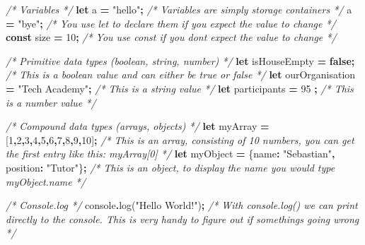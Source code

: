 \documentclass[
]{article}
\newenvironment{Shaded}{\begin{snugshade}}{\end{snugshade}}
\newcommand{\BuiltInTok}[1]{#1}
\newcommand{\CommentTok}[1]{\textcolor[rgb]{0.56,0.35,0.01}{\textit{#1}}}
\newcommand{\DataTypeTok}[1]{\textcolor[rgb]{0.13,0.29,0.53}{#1}}
\newcommand{\DecValTok}[1]{\textcolor[rgb]{0.00,0.00,0.81}{#1}}
\newcommand{\FunctionTok}[1]{\textcolor[rgb]{0.00,0.00,0.00}{#1}}
\newcommand{\KeywordTok}[1]{\textcolor[rgb]{0.13,0.29,0.53}{\textbf{#1}}}
\newcommand{\NormalTok}[1]{#1}
\newcommand{\OperatorTok}[1]{\textcolor[rgb]{0.81,0.36,0.00}{\textbf{#1}}}
\newcommand{\StringTok}[1]{\textcolor[rgb]{0.31,0.60,0.02}{#1}}
\begin{document}
\begin{Shaded}
\begin{Highlighting}[]
\CommentTok{/* Variables */}
\KeywordTok{let}\NormalTok{ a }\OperatorTok{=} \StringTok{"hello"}\OperatorTok{;} \CommentTok{/* Variables are simply storage containers */}
\NormalTok{a }\OperatorTok{=} \StringTok{"bye"}\OperatorTok{;}       \CommentTok{/* You use let to declare them if you expect the value to change */}
\KeywordTok{const}\NormalTok{ size }\OperatorTok{=} \DecValTok{10}\OperatorTok{;} \CommentTok{/* You use const if you dont expect the value to change */}

\CommentTok{/* Primitive data types (boolean, string, number) */}
\KeywordTok{let}\NormalTok{ isHouseEmpty }\OperatorTok{=} \KeywordTok{false}\OperatorTok{;}             \CommentTok{/* This is a boolean value and can either be true or false */}
\KeywordTok{let}\NormalTok{ ourOrganisation }\OperatorTok{=} \StringTok{"Tech Academy"}\OperatorTok{;} \CommentTok{/* This is a string value */}
\KeywordTok{let}\NormalTok{ participants }\OperatorTok{=} \DecValTok{95}  \OperatorTok{;}              \CommentTok{/* This is a number value */}

\CommentTok{/* Compound data types (arrays, objects) */}
\KeywordTok{let}\NormalTok{ myArray }\OperatorTok{=}\NormalTok{ [}\DecValTok{1}\OperatorTok{,}\DecValTok{2}\OperatorTok{,}\DecValTok{3}\OperatorTok{,}\DecValTok{4}\OperatorTok{,}\DecValTok{5}\OperatorTok{,}\DecValTok{6}\OperatorTok{,}\DecValTok{7}\OperatorTok{,}\DecValTok{8}\OperatorTok{,}\DecValTok{9}\OperatorTok{,}\DecValTok{10}\NormalTok{]}\OperatorTok{;}                  \CommentTok{/* This is an array, consisting of 10 numbers, you can get the first entry like this: myArray[0] */}
\KeywordTok{let}\NormalTok{ myObject }\OperatorTok{=}\NormalTok{ \{}\DataTypeTok{name}\OperatorTok{:} \StringTok{"Sebastian"}\OperatorTok{,} \DataTypeTok{position}\OperatorTok{:} \StringTok{"Tutor"}\NormalTok{\}}\OperatorTok{;} \CommentTok{/* This is an object, to display the name you would type myObject.name */}

\CommentTok{/* Console.log */}
\BuiltInTok{console}\OperatorTok{.}\FunctionTok{log}\NormalTok{(}\StringTok{"Hello World!"}\NormalTok{)}\OperatorTok{;} \CommentTok{/* With console.log() we can print directly to the console. This is very handy to figure out if something\textquotesingle{}s going wrong */}


\end{Highlighting}
\end{Shaded}
\end{document}
